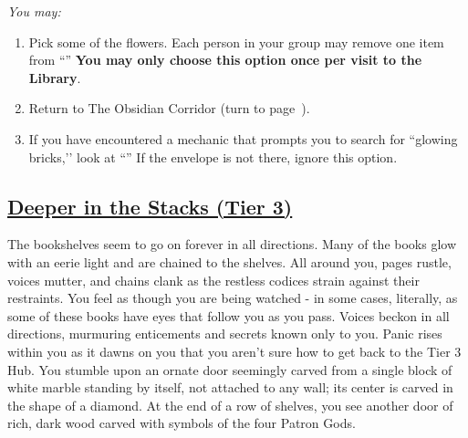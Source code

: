\documentclass[sheet]{GL2020}
\begin{document}
\vspace{0.5cm}

\begingroup
\itshape
You may:
\begin{enumerate}[A]
  \item Pick some of the flowers. Each person in your group may remove one item from ``\sBlackCrocusEnvelope{}'' \textbf{You may only choose this option once per visit to the Library}.
	\item Return to The Obsidian Corridor (turn to page~\pageref{ObsidianCorridor}).
	\item If you have encountered a mechanic that prompts you to search for ``glowing bricks,’’ look at ``\sBlueBrickNineEnvelope{}'' If the envelope is not there, ignore this option.
\end{enumerate}
\endgroup

\clearpage

\begin{center}\section*{\underline{Deeper in the Stacks (Tier 3)}}\end{center}
\label{DeeperStacks}

The bookshelves seem to go on forever in all directions. Many of the books glow with an eerie light and are chained to the shelves. All around you, pages rustle, voices mutter, and chains clank as the restless codices strain against their restraints. You feel as though you are being watched - in some cases, literally, as some of these books have eyes that follow you as you pass. Voices beckon in all directions, murmuring enticements and secrets known only to you. Panic rises within you as it dawns on you that you aren’t sure how to get back to the Tier 3 Hub. You stumble upon an ornate door seemingly carved from a single block of white marble standing by itself, not attached to any wall; its center is carved in the shape of a diamond. At the end of a row of shelves, you see another door of rich, dark wood carved with symbols of the four Patron Gods. 

\vspace{0.5cm}
\end{document}
